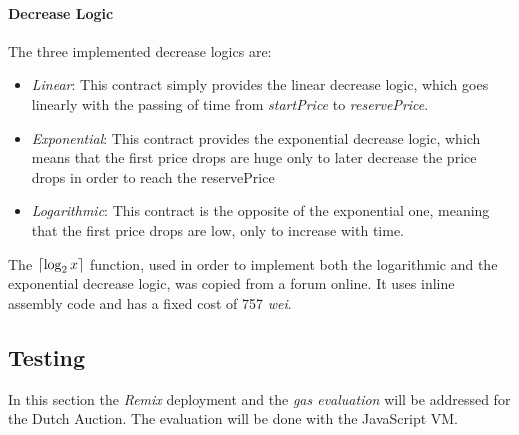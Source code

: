 \documentclass[11pt, a4paper]{report}
\DeclarePairedDelimiter{\ceil}{\lceil}{\rceil}
\begin{document}
	
	\paragraph*{Decrease Logic}
	The three implemented decrease logics are:
	\begin{itemize}
		\item \emph{Linear}: This contract simply provides the linear decrease logic, which goes linearly with the passing of time from \emph{startPrice} to \emph{reservePrice}.
		\item \emph{Exponential}: This contract provides the exponential decrease logic, which means that the first price drops are huge only to later decrease the price drops in order to reach the reservePrice
		\item \emph{Logarithmic}: This contract is the opposite of the exponential one, meaning that the first price drops are low, only to increase with time.
	\end{itemize}
	The $\ceil{\log_2x}$ function, used in order to implement both the logarithmic and the exponential decrease logic, was copied from a forum online. It uses inline assembly code and has a fixed cost of 757 \emph{wei}.
	
	\subsection*{Testing}
	In this section the \emph{Remix} deployment and the \emph{gas evaluation} will be addressed for the Dutch Auction. The evaluation will be done with the JavaScript VM.
	
\end{document}
